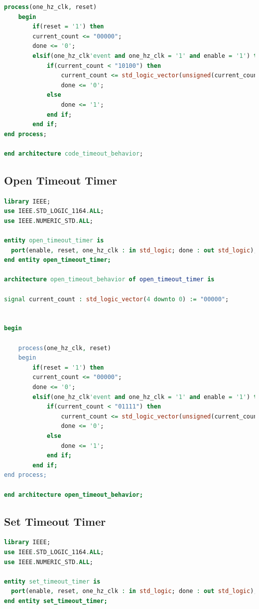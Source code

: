 \documentclass[11pt]{article}
\begin{document}
\begin{appendices}
\begin{lstlisting}[language=VHDL]
    process(one_hz_clk, reset)
    begin
        if(reset = '1') then 
	    current_count <= "00000";
	    done <= '0';
        elsif(one_hz_clk'event and one_hz_clk = '1' and enable = '1') then
            if(current_count < "10100") then
                current_count <= std_logic_vector(unsigned(current_count) + 1);
                done <= '0';
            else
                done <= '1';
            end if;
        end if;
end process;

end architecture code_timeout_behavior;

\end{lstlisting}

\subsection{Open Timeout Timer}

\begin{lstlisting}[language=VHDL]
library IEEE;
use IEEE.STD_LOGIC_1164.ALL;
use IEEE.NUMERIC_STD.ALL;

entity open_timeout_timer is
  port(enable, reset, one_hz_clk : in std_logic; done : out std_logic);
end entity open_timeout_timer;

architecture open_timeout_behavior of open_timeout_timer is

signal current_count : std_logic_vector(4 downto 0) := "00000";


begin

    process(one_hz_clk, reset)
    begin
        if(reset = '1') then
	    current_count <= "00000";
	    done <= '0';
        elsif(one_hz_clk'event and one_hz_clk = '1' and enable = '1') then
            if(current_count < "01111") then
                current_count <= std_logic_vector(unsigned(current_count) + 1);
                done <= '0';
            else
                done <= '1';
            end if;
        end if;
end process;

end architecture open_timeout_behavior;

\end{lstlisting}

\subsection{Set Timeout Timer}

\begin{lstlisting}[language=VHDL]
library IEEE;
use IEEE.STD_LOGIC_1164.ALL;
use IEEE.NUMERIC_STD.ALL;

entity set_timeout_timer is
  port(enable, reset, one_hz_clk : in std_logic; done : out std_logic);
end entity set_timeout_timer;


\end{lstlisting}
\end{appendices}
\end{document}
